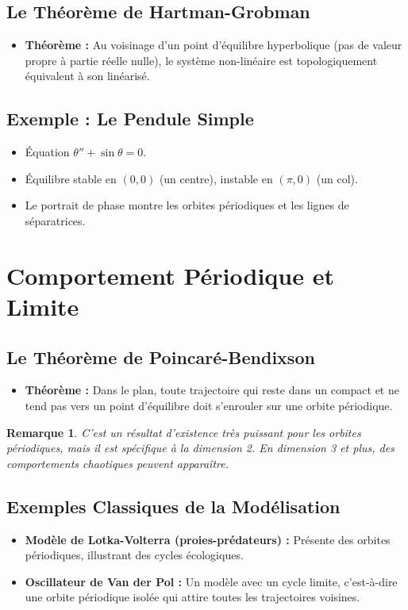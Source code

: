 \documentclass[12pt, a4paper, parskip=full]{report}
\theoremstyle{agregstyle}
\newtheorem{remark}[definition]{Remarque}
\begin{document}
\subsection{Le Théorème de Hartman-Grobman}
\begin{itemize}
    \item \textbf{Théorème :} Au voisinage d'un point d'équilibre hyperbolique (pas de valeur propre à partie réelle nulle), le système non-linéaire est topologiquement équivalent à son linéarisé.
\end{itemize}
\subsection{Exemple : Le Pendule Simple}
\begin{itemize}
    \item Équation $\theta'' + \sin\theta = 0$.
    \item Équilibre stable en $(0,0)$ (un centre), instable en $(\pi,0)$ (un col).
    \item Le portrait de phase montre les orbites périodiques et les lignes de séparatrices.
\end{itemize}

\section{Comportement Périodique et Limite}
\subsection{Le Théorème de Poincaré-Bendixson}
\begin{itemize}
    \item \textbf{Théorème :} Dans le plan, toute trajectoire qui reste dans un compact et ne tend pas vers un point d'équilibre doit s'enrouler sur une orbite périodique.
\end{itemize}
\begin{remark}
    C'est un résultat d'existence très puissant pour les orbites périodiques, mais il est spécifique à la dimension 2. En dimension 3 et plus, des comportements chaotiques peuvent apparaître.
\end{remark}
\subsection{Exemples Classiques de la Modélisation}
\begin{itemize}
    \item \textbf{Modèle de Lotka-Volterra (proies-prédateurs) :} Présente des orbites périodiques, illustrant des cycles écologiques.
    \item \textbf{Oscillateur de Van der Pol :} Un modèle avec un cycle limite, c'est-à-dire une orbite périodique isolée qui attire toutes les trajectoires voisines.
\end{itemize}
\end{document}
